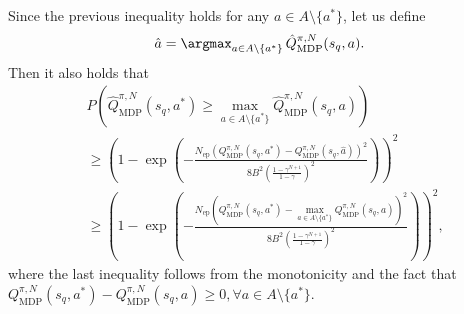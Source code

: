 \begin{myproof}
%
Since the previous inequality holds for any $a \in A \setminus \{a^*\}$, let us define
\begin{align}
    \hat{a} = \argmax_{a \in A \setminus \{a^*\}} \, \hat{Q}_\text{MDP}^{\pi, N}(s_q, a).
\end{align}
%
Then it also holds that
\begin{align}
    &P \left( \hat{Q}_\text{MDP}^{\pi, N}(s_q, a^*) \geq \max_{a \in A \setminus \{a^*\}} \hat{Q}_\text{MDP}^{\pi, N}(s_q, a) \right) \nonumber \\
    &\geq \left( 1 - \exp \left( - \frac{N_\text{ep}  \left( Q_\text{MDP}^{\pi, N}(s_q, a^*) - Q_\text{MDP}^{\pi, N}(s_q, \hat{a}) \right) ^2}{8B^2 \left( \frac{1-\gamma^{N+1}}{1-\gamma}\right)^2} \right) \right)^2 \\
    &\geq \left( 1 - \exp \left( - \frac{N_\text{ep}  \left( Q_\text{MDP}^{\pi, N}(s_q, a^*) - \max_{a \in A \setminus \{a^*\}}  Q_\text{MDP}^{\pi, N}(s_q, a) \right) ^2}{8B^2 \left( \frac{1-\gamma^{N+1}}{1-\gamma}\right)^2} \right) \right)^2, \label{eqn_temp_prob1}
\end{align}
where the last inequality follows from the monotonicity and the fact that $Q_\text{MDP}^{\pi, N}(s_q, a^*) - Q_\text{MDP}^{\pi, N}(s_q, a) \geq 0, \forall a \in A \setminus \{a^*\}$.






\end{myproof}
